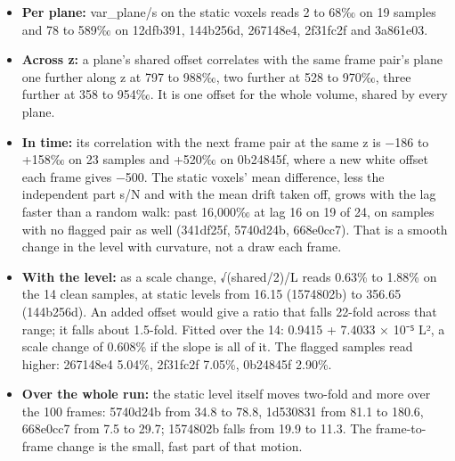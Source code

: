 \begin{enumerate}
\begin{itemize}
\item \textbf{Per plane:} var\_\allowbreak{}plane/s on the static voxels reads 2 to 68‰ on 19 samples and 78 to 589‰ on 12dfb391, 144b256d, 267148e4, 2f31fc2f and 3a861e03.
\item \textbf{Across z:} a plane's shared offset correlates with the same frame pair's plane one further along z at 797 to 988‰, two further at 528 to 970‰, three further at 358 to 954‰. It is one offset for the whole volume, shared by every plane.
\item \textbf{In time:} its correlation with the next frame pair at the same z is −186 to +158‰ on 23 samples and +520‰ on 0b24845f, where a new white offset each frame gives −500. The static voxels' mean difference, less the independent part s/N and with the mean drift taken off, grows with the lag faster than a random walk: past 16,000‰ at lag 16 on 19 of 24, on samples with no flagged pair as well (341df25f, 5740d24b, 668e0cc7). That is a smooth change in the level with curvature, not a draw each frame.
\item \textbf{With the level:} as a scale change, √(shared/2)/L reads 0.63\% to 1.88\% on the 14 clean samples, at static levels from 16.15 (1574802b) to 356.65 (144b256d). An added offset would give a ratio that falls 22-fold across that range; it falls about 1.5-fold. Fitted over the 14: 0.9415 + 7.4033 × 10⁻⁵ L², a scale change of 0.608\% if the slope is all of it. The flagged samples read higher: 267148e4 5.04\%, 2f31fc2f 7.05\%, 0b24845f 2.90\%.
\item \textbf{Over the whole run:} the static level itself moves two-fold and more over the 100 frames: 5740d24b from 34.8 to 78.8, 1d530831 from 81.1 to 180.6, 668e0cc7 from 7.5 to 29.7; 1574802b falls from 19.9 to 11.3. The frame-to-frame change is the small, fast part of that motion.
\end{itemize}


\end{enumerate}
